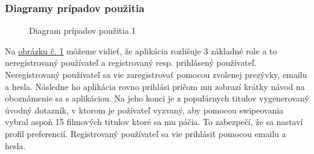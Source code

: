 \subsubsection{Diagramy prípadov použitia}
\begin{figure}[hbt!]
  \centering  
  \def\stackalignment{c}
           {\scriptsize}
	\caption{Diagram prípadov použitia 1}
	\label{usecase1}
\end{figure}

Na \hyperref[usecase1]{obrázku č. \ref{usecase1}} môžeme vidieť, že aplikácia rozlišuje 3 základné role a to neregistrovaný používateľ a registrovaný resp. prihlásený používateľ. Neregistrovaný používateľ sa vie zaregistrovať pomocou zvolenej prezývky, emailu a hesla. Následne ho aplikácia rovno prihlási pričom mu zobrazí krátky návod na oboznámenie sa s aplikáciou. Na jeho konci je z populárnych titulov vygenerovaný úvodný dotazník, v ktorom je požívateľ vyzvaný, aby pomocou swipeovania vybral aspoň 15 filmových titulov ktoré sa mu páčia. To zabezpečí, že sa nastaví profil preferencií. Registrovaný používateľ sa vie prihlásiť pomocou emailu a hesla.
\pagebreak

